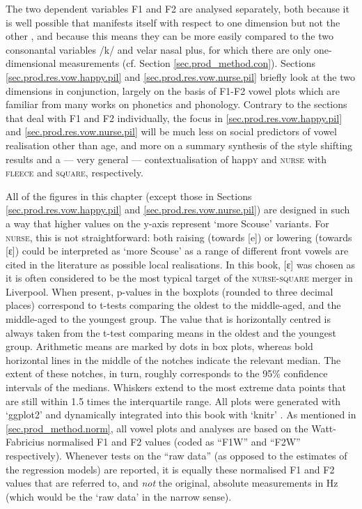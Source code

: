 The two dependent variables F1 and F2 are analysed separately, both because it is well possible that  manifests itself with respect to one dimension but not the other \parencite[cf.][]{harrington2006}, and because this means they can be more easily compared to the two consonantal variables /k/ and velar nasal plus, for which there are only one-dimensional measurements (cf. Section \ref{sec.prod_method.con}).
Sections \ref{sec.prod.res.vow.happy.pil} and \ref{sec.prod.res.vow.nurse.pil} briefly look at the two dimensions in conjunction, largely on the basis of F1-F2 vowel plots which are familiar from many works on phonetics and phonology.
Contrary to the sections that deal with F1 and F2 individually, the focus in \ref{sec.prod.res.vow.happy.pil} and \ref{sec.prod.res.vow.nurse.pil} will be much less on social predictors of vowel realisation other than age, and more on a summary synthesis of the style shifting results and a --- very general --- contextualisation of happ\textsc{y} and \textsc{nurse} with \textsc{fleece} and \textsc{square}, respectively.

All of the figures in this chapter (except those in Sections \ref{sec.prod.res.vow.happy.pil} and \ref{sec.prod.res.vow.nurse.pil}) are designed in such a way that higher values on the y-axis represent `more Scouse' variants.
For \textsc{nurse}, this is not straightforward: both raising (towards [e]) or lowering (towards [ɛ]) could be interpreted as \enquote*{more Scouse} as a range of different front vowels are cited in the literature as possible local realisations.
In this book, [ɛ] was chosen as it is often considered to be the most typical target of the \textsc{nurse}-\textsc{square} merger in Liverpool.
When present, p-values in the boxplots (rounded to three decimal places) correspond to t-tests comparing the oldest to the middle-aged, and the middle-aged to the youngest group.
The value that is horizontally centred is always taken from the t-test comparing means in the oldest and the youngest group.
Arithmetic means are marked by dots in box plots, whereas bold horizontal lines in the middle of the notches indicate the relevant median.
The extent of these notches, in turn, roughly corresponds to the 95\% confidence intervals of the medians.
Whiskers extend to the most extreme data points that are still within 1.5 times the interquartile range.
All plots were generated with `ggplot2' \parencite{ggplot2} and dynamically integrated into this book with `knitr' \parencite{knitr}.
As mentioned in \ref{sec.prod_method.norm}, all vowel plots and analyses are based on the Watt-Fabricius normalised F1 and F2 values (coded as ``F1W'' and ``F2W'' respectively).
Whenever tests on the ``raw data'' (as opposed to the estimates of the regression models) are reported, it is equally these normalised F1 and F2 values that are referred to, and \emph{not} the original, absolute measurements in Hz (which would be the `raw data' in the narrow sense).

